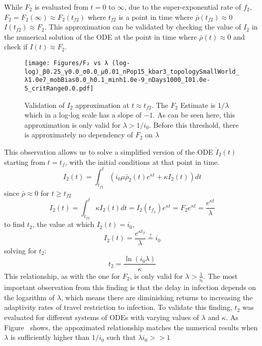 While $F_2$ is evaluated from $t=0$ to $\infty$, due to the super-exponential rate of $f_2$, $F_2=F_2(\infty)\approx F_2(t_{f2})$ where $t_{f2}$ is a point in time where $\bar\rho(t_{f2})\approx 0$  $I({t_{f2}})\approx F_2$. This approximation can be validated by checking the value of $I_2$ in the numerical solution of the ODE at the point in time where $\bar\rho(t)\approx 0$ and check if $I(t)\approx F_2$. 

\begin{figure}[!ht]
    \centering
    \texttt{[image: Figures/F₂ vs λ (log-log)\_β0.25\_γ0.0\_σ0.0\_μ0.01\_nPop15\_kbar3\_topologySmallWorld\_λ1.0e7\_mobBias0.0\_h0.1\_minh1.0e-9\_nDays1000\_I01.0e-5\_critRange0.0.pdf]}
    \caption{\small Validation of $I_2$ approximation at $t \approx t_{f2}$. The $F_2$ Estimate is $1/\lambda$ which in a log-log scale has a slope of $-1$. As can be seen here, this approximation is only valid for $\lambda>1/i_0$. Before this threshold, there is approximately no dependency of $F_2$ on $\lambda$ }

\end{figure}

This observation allows us to solve a simplified version of the ODE $\dot I_2(t)$ starting from $t=t_f$, with the initial conditions at that point in time.
\begin{equation} I_2(t) = \int_{t_{f2}}^t \left(i_{0} \mu \bar \rho_{2}{(t)} e^{\kappa t} + \kappa I_{2}{\left(t \right)}\right) dt\end{equation}
since $\bar \rho \approx 0$ for $t\ge t_{f2}$ 
\begin{equation}I_2(t) = \int_{t_{f2}}^t  \kappa I_{2}{\left(t \right)} dt = I_2(t_{f_2})e^{\kappa t} = F_2 e^{\kappa t} =\frac{e^{\kappa t}}{\lambda}\end{equation}
to find $t_2$, the value at which $I_2(t)=i_0$, 
\begin{equation}I_2(t) =\frac{e^{\kappa t_2}}{\lambda}\stackrel{!}{=} i_0\end{equation}
solving for $t_2$:
\begin{equation}t_2=\frac{\ln(i_0 \lambda)}{\kappa}\end{equation}
This relationship, as with the one for $F_2$, is only valid for $\lambda> \frac{1}{i_0}$. The most important observation from this finding is that the delay in infection depends on the logarithm of $\lambda$, which means there are diminishing returns to increasing the adaptivity rates of travel restriction to infection. To validate this finding, $t_2$ was evaluated for different systems of ODEs with varying values of $\lambda$ and $\kappa$. As Figure~%
shows, the appoximated relationship matches the numerical results when $\lambda$ is sufficiently higher than $1/i_0$ such that $\lambda i_0 >>1$ 




